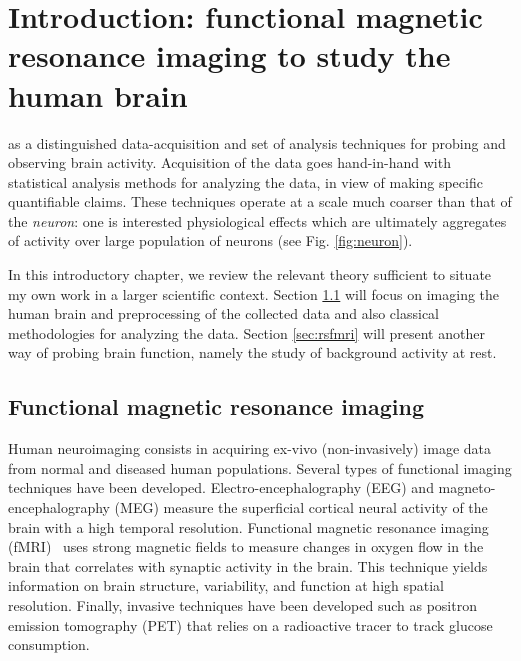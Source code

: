 \chapter{Introduction: functional magnetic resonance imaging to study the human brain}\label{chap:bigpic}


\minitoc
 
 as a distinguished data-acquisition and set of  analysis techniques for probing and observing brain activity.
Acquisition of the data goes hand-in-hand with
  statistical analysis methods for analyzing the data, in view of making specific quantifiable claims. These techniques operate at a scale much coarser than that of the \textit{neuron}: one is interested physiological effects which are ultimately aggregates of activity over large population of neurons (see Fig. \ref{fig:neuron}).

In this introductory chapter, we review the relevant theory sufficient to situate my own work in a larger scientific context. Section \ref{sec:fmri} will
focus on imaging the human brain and preprocessing of the collected data and also classical methodologies for analyzing the data.
  Section \ref{sec:rsfmri} will present another way of probing brain function,
  namely the study of background activity at rest.


\section{Functional magnetic resonance imaging}
\label{sec:fmri}
Human neuroimaging consists in acquiring ex-vivo
(non-invasively) image data from normal and
diseased human populations.
Several types of functional imaging techniques have been developed. Electro-encephalography (EEG) and magneto-encephalography (MEG) measure the superficial cortical neural activity of the brain with a high temporal resolution. Functional
magnetic resonance imaging (fMRI)~\citep{agawa1990,ogawa1990b} uses strong magnetic fields to measure changes in
oxygen flow in the brain that correlates with synaptic activity in the brain. This technique yields
information on brain structure, variability, and function at high
spatial resolution. Finally, invasive
techniques have been developed such as positron emission tomography (PET) that
relies on a radioactive tracer to track glucose consumption.

